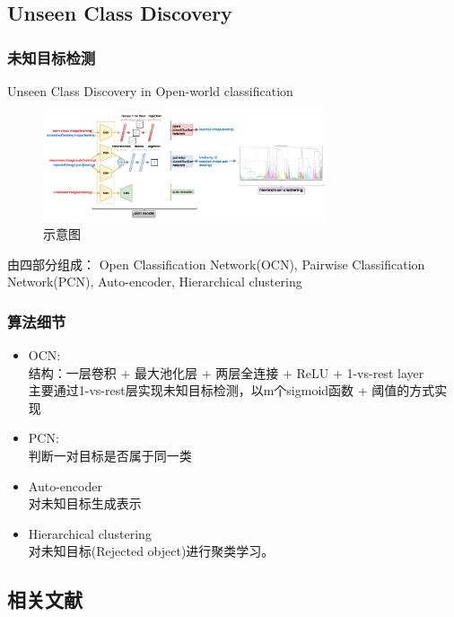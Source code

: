 \documentclass{beamer}
\begin{document}
\subsection{Unseen Class Discovery}
\begin{frame}
\frametitle{未知目标检测}
Unseen Class Discovery in Open-world classification
\begin{figure}
\centering
\includegraphics[width=0.75\textwidth]{Materials/Unseen1.png}
\caption{示意图}
\end{figure}
由四部分组成：
Open Classification Network(OCN), Pairwise Classification Network(PCN), Auto-encoder, Hierarchical clustering
\end{frame}

\begin{frame}
\frametitle{算法细节}
\begin{itemize}
\item OCN: \\
结构：一层卷积 + 最大池化层 + 两层全连接 + ReLU + 1-vs-rest layer\\
主要通过1-vs-rest层实现未知目标检测，以m个sigmoid函数 + 阈值的方式实现
\item PCN: \\
判断一对目标是否属于同一类
\item Auto-encoder \\
对未知目标生成表示
\item Hierarchical clustering\\
对未知目标(Rejected object)进行聚类学习。
\end{itemize}
\end{frame}

\subsection{相关文献}
%
%
\end{document}
